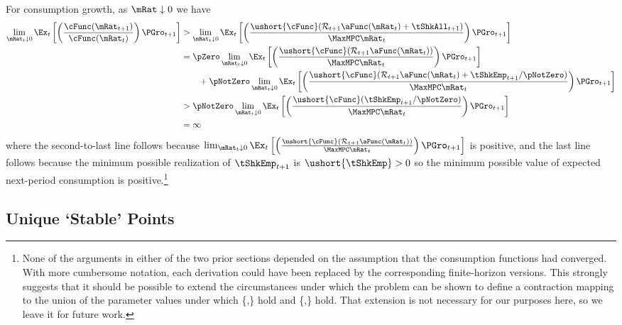 \documentclass[ProjectDLO]{subfiles}
\begin{document}
For consumption growth, as $\mRat \downarrow 0$ we have
\begin{align*}
  \lim_{\mRat_{t} \downarrow 0} \Ex_{t}\left[\left(\frac{\cFunc({\mRat}_{t+1})}{\cFunc(\mRat_t)}\right){\PGro}_{t+1}\right]
  & > \lim_{\mRat_{t} \downarrow 0} \Ex_{t}\left[\left(\frac{\ushort{\cFunc}({\mathcal{\mathcal{R}}}_{t+1}\aFunc(\mRat_{t})+{%
    \tShkAll}_{t+1})}{\MaxMPC \mRat_{t}}\right){\PGro}_{t+1}\right]  \notag \\
  & = \pZero \lim_{\mRat_{t} \downarrow 0} \Ex_{t}\left[\left(\frac{\ushort{\cFunc}({\mathcal{\mathcal{R}}}_{t+1}\aFunc(\mRat_{t}))}{\MaxMPC \mRat_{t}}\right){\PGro}_{t+1}\right] \\
  & ~~~~~~ + \pNotZero \lim_{\mRat_{t} \downarrow 0}  \Ex_{t}\left[\left(\frac{\ushort{\cFunc}({\mathcal{\mathcal{R}}}_{t+1}\aFunc(\mRat_{t})+
    \tShkEmp_{t+1}/\pNotZero)}{\MaxMPC \mRat_{t}}\right){\PGro}_{t+1}\right]  \\\notag
  & > \pNotZero \lim_{\mRat_{t} \downarrow 0} \Ex_{t}\left[\left(\frac{\ushort{\cFunc}(
    \tShkEmp_{t+1}/\pNotZero)}{\MaxMPC \mRat_{t}}\right){\PGro}_{t+1}\right] \\
  & = \infty \nonumber
\end{align*}
where the second-to-last line follows because  $\lim_{\mRat_{t} \downarrow 0} \Ex_{t}\left[\left(\frac{\ushort{\cFunc}({\mathcal{\mathcal{R}}}_{t+1}\aFunc(\mRat_{t}))}{\MaxMPC \mRat_{t}}\right){\PGro}_{t+1}\right]$ is positive, and the last line follows because the minimum possible realization of $\tShkEmp_{t+1}$ is $\ushort{\tShkEmp}>0$ so the minimum possible value of expected next-period consumption is positive.\footnote{None of the arguments in either of the two prior sections depended on the assumption that the consumption functions had converged.  With more cumbersome notation, each derivation could have been replaced by the corresponding finite-horizon versions.  This strongly suggests that it should be possible to extend the circumstances under which the problem can be shown to define a contraction mapping to the union of the parameter values under which \{\RIC,\FHWC\} hold and \{\FVAC,\WRIC\} hold.  That extension is not necessary for our purposes here, so we leave it for future work.}

\hypertarget{onetarget}{}
\hypertarget{Unique-Stable-Points}{}

\subsection{Unique `Stable' Points}\label{subsec:onetarget}\hypertarget{TheoremTarget}{}
\end{document}
